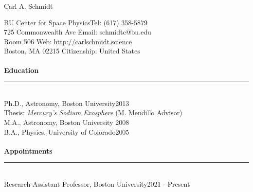 \documentclass[12pt]{report}
\begin{document}
\newpage  
{\noindent}{\Large Carl A. Schmidt} \\ %
%
%

%
\thispagestyle{myheadings}

\noindent BU Center for Space Physics\hfill Tel: (617) 358-5879\\
725 Commonwealth Ave \hfill Email: schmidtc@bu.edu\\
Room 506 \hfill Web: \url{http://carlschmidt.science}\\
Boston, MA 02215 \hfill Citizenship: United States\\
\vspace{2 mm}\\
\bf{Education}\rm\\
\rule{\textwidth}{1pt}\\
\noindent Ph.D., Astronomy, Boston University\hfill 2013\\
\indent Thesis: {\it Mercury's Sodium Exosphere} (M. Mendillo Advisor)\\
\noindent M.A., Astronomy, Boston University \hfill 2008\\
\noindent B.A., Physics, University of Colorado\hfill 2005\\
\vspace{2 mm}\\
\bf{Appointments}\rm\\
\rule{\textwidth}{1pt}\\
\noindent Research Assistant Professor, Boston University\hfill 2021 - Present\\
\end{document}
